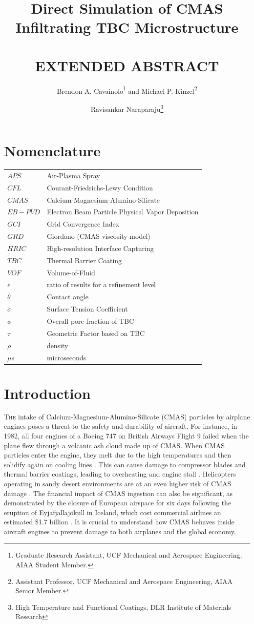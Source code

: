\documentclass[conf]{new-aiaa}
\title{Direct Simulation of CMAS Infiltrating TBC Microstructure \\
\\
\textbf{EXTENDED ABSTRACT}}
\author{Brendon A. Cavainolo\footnote{Graduate Research Assistant, UCF Mechanical and Aerospace Engineering, AIAA Student Member.} and Michael P. Kinzel\footnote{Assistant Professor, UCF Mechanical and Aerospace Engineering, AIAA Senior Member.}}
\affil{University of Central Florida (UCF), Orlando, FL, 32816, United States}
\author{Ravisankar Naraparaju\footnote{High Temperature and Functional Coatings, DLR Institute of Materials Research}}
\affil{German Aerospace Center (DLR), Cologne, 51147. Germany}
\begin{document}
\maketitle
\section{Nomenclature}

{\renewcommand\arraystretch{1.0}
\noindent\begin{longtable*}{@{}l @{\quad=\quad} l@{}}
$APS$  & Air-Plasma Spray \\
$CFL$   & Courant-Friedrichs-Lewy Condition \\
$CMAS$  & Calcium-Magnesium-Alumino-Silicate \\
$EB-PVD$ &    Electron Beam Particle Physical Vapor Deposition \\
$GCI$ & Grid Convergence Index \\
$GRD$ & Giordano (CMAS viscosity model) \\
$HRIC$ & High-resolution Interface Capturing \\
$TBC$ & Thermal Barrier Coating \\
$VOF$ & Volume-of-Fluid \\
$\epsilon$ & ratio of results for a refinement level \\
$\theta$ & Contact angle \\
$\sigma$   & Surface Tension Coefficient \\
$\phi$ & Overall pore fraction of TBC \\
$\tau$ & Geometric Factor based on TBC \\
$\rho$ & density \\
$\mu s$ & microseconds
\end{longtable*}}

\section{Introduction}
\lettrine{T}{he} intake of Calcium-Magnesium-Alumino-Silicate (CMAS) particles by airplane engines poses a threat to the safety and durability of aircraft. For instance, in 1982, all four engines of a Boeing 747 on British Airways Flight 9 failed when the plane flew through a volcanic ash cloud made up of CMAS. When CMAS particles enter the engine, they melt due to the high temperatures and then solidify again on cooling lines \cite{Chen2015}. This can cause damage to compressor blades and thermal barrier coatings, leading to overheating and engine stall \cite{Chen2015}. Helicopters operating in sandy desert environments are at an even higher risk of CMAS damage \cite{Smialek}. The financial impact of CMAS ingestion can also be significant, as demonstrated by the closure of European airspace for six days following the eruption of Eyjafjallajökull in Iceland, which cost commercial airlines an estimated \$1.7 billion \cite{Thehumanconditionblog_2010}. It is crucial to understand how CMAS behaves inside aircraft engines to prevent damage to both airplanes and the global economy.
\end{document}
